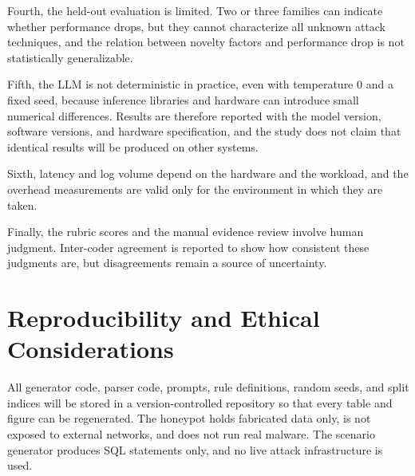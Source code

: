 \documentclass[12pt,a4paper]{report}
\begin{document}
Fourth, the held-out evaluation is limited. Two or three families can indicate whether performance drops, but they cannot characterize all unknown attack techniques, and the relation between novelty factors and performance drop is not statistically generalizable.

Fifth, the LLM is not deterministic in practice, even with temperature 0 and a fixed seed, because inference libraries and hardware can introduce small numerical differences. Results are therefore reported with the model version, software versions, and hardware specification, and the study does not claim that identical results will be produced on other systems.

Sixth, latency and log volume depend on the hardware and the workload, and the overhead measurements are valid only for the environment in which they are taken.

Finally, the rubric scores and the manual evidence review involve human judgment. Inter-coder agreement is reported to show how consistent these judgments are, but disagreements remain a source of uncertainty.

\section{Reproducibility and Ethical Considerations}
All generator code, parser code, prompts, rule definitions, random seeds, and split indices will be stored in a version-controlled repository so that every table and figure can be regenerated. The honeypot holds fabricated data only, is not exposed to external networks, and does not run real malware. The scenario generator produces SQL statements only, and no live attack infrastructure is used.

\printbibliography[title={References}]
\end{document}
